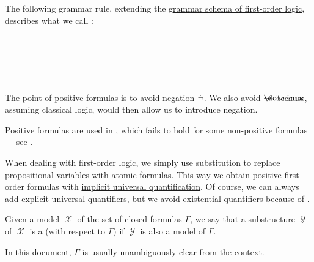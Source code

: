 \begin{definition}\label{def:positive_formula}
  The following grammar rule, extending the \hyperref[def:first_order_syntax/grammar_schema]{grammar schema of first-order logic}, describes what we call :
  \begin{bnf*}
     {\bnftsq{\( \syntop \)} \bnfor} \\
     \\
     \\
     \\
  \end{bnf*}
\end{definition}
\begin{comments}
  \item The point of positive formulas is to avoid \hyperref[def:propositional_alphabet/negation]{negation \( \dot\neg \)}. We also avoid \( \synimplies \) because, assuming classical logic,  would then allow us to introduce negation.

  \item Positive formulas are used in , which fails to hold for some non-positive formulas --- see .

  \item When dealing with first-order logic, we simply use \hyperref[thm:first_order_substitution_equivalence/propositional]{substitution} to replace propositional variables with atomic formulas. This way we obtain positive first-order formulas with \hyperref[thm:implicit_universal_quantification]{implicit universal quantification}. Of course, we can always add explicit universal quantifiers, but we avoid existential quantifiers because of .
\end{comments}

\begin{definition}\label{def:first_order_submodel}
  Given a \hyperref[def:first_order_model]{model} \( \mscrX \) of the set of \hyperref[def:first_order_syntax/closed_formula]{closed formulas} \( \Gamma \), we say that a \hyperref[def:first_order_substructure]{substructure} \( \mscrY \) of \( \mscrX \) is a  (with respect to \( \Gamma \)) if \( \mscrY \) is also a model of \( \Gamma \).
\end{definition}
\begin{comments}
  \item In this document, \( \Gamma \) is usually unambiguously clear from the context.
\end{comments}

